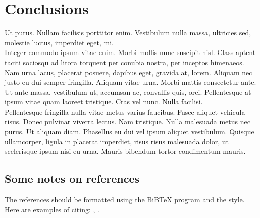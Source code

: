 \documentclass{jacsart}
\begin{document}
\section{Conclusions}
Ut purus. Nullam facilisis porttitor enim. Vestibulum nulla massa, ultricies
sed, molestie luctus, imperdiet eget, mi. \\
\indent Integer commodo ipsum vitae enim. Morbi mollis nunc suscipit nisl.
Class aptent taciti sociosqu ad litora torquent per conubia nostra, per
inceptos himenaeos. Nam urna lacus, placerat posuere, dapibus eget, gravida
at, lorem. Aliquam nec justo eu dui semper fringilla. Aliquam vitae urna.
Morbi mattis consectetur ante. Ut ante massa, vestibulum ut, accumsan ac,
convallis quis, orci. Pellentesque at ipsum vitae quam laoreet tristique. Cras
vel nunc. Nulla facilisi.\\
\indent Pellentesque fringilla nulla vitae metus varius faucibus. Fusce aliquet
vehicula risus. Donec pulvinar viverra lectus. Nam tristique. Nulla malesuada
metus nec purus. Ut aliquam diam. Phasellus eu dui vel ipsum aliquet
vestibulum. Quisque ullamcorper, ligula in placerat imperdiet, risus risus
malesuada dolor, ut scelerisque ipsum nisi eu urna. Mauris bibendum tortor
condimentum mauris.  


\subsection{Some notes on references}\label{bib}
The references should be formatted using the BiBTeX program and the style. Here are examples of citing: \cite{sambuc75}, \cite{chiclana04,
bartkiewicz00, atanassov83}. 



  
\end{document}
